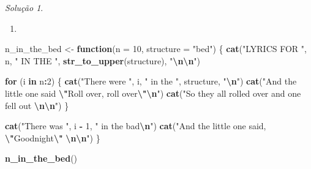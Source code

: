 \documentclass[
]{latex/krantz}
\newenvironment{Shaded}{\begin{snugshade}}{\end{snugshade}}
\newcommand{\AttributeTok}[1]{\textcolor[rgb]{0.13,0.29,0.53}{#1}}
\newcommand{\ControlFlowTok}[1]{\textcolor[rgb]{0.13,0.29,0.53}{\textbf{#1}}}
\newcommand{\DecValTok}[1]{\textcolor[rgb]{0.00,0.00,0.81}{#1}}
\newcommand{\FunctionTok}[1]{\textcolor[rgb]{0.13,0.29,0.53}{\textbf{#1}}}
\newcommand{\NormalTok}[1]{#1}
\newcommand{\OtherTok}[1]{\textcolor[rgb]{0.56,0.35,0.01}{#1}}
\newcommand{\SpecialCharTok}[1]{\textcolor[rgb]{0.81,0.36,0.00}{\textbf{#1}}}
\newcommand{\StringTok}[1]{\textcolor[rgb]{0.31,0.60,0.02}{#1}}
\providecommand{\tightlist}{%
  \setlength{\itemsep}{0pt}\setlength{\parskip}{0pt}}
\theoremstyle{definition}
\theoremstyle{definition}
\theoremstyle{definition}
\theoremstyle{definition}
\theoremstyle{remark}
\newtheorem*{solution}{Solução}
\begin{document}
\begin{solution}
\begin{enumerate}
\def\labelenumi{\alph{enumi}.}
\setcounter{enumi}{1}
\tightlist
\item
\end{enumerate}

\begin{Shaded}
\begin{Highlighting}[]
\NormalTok{n\_in\_the\_bed }\OtherTok{\textless{}{-}} \ControlFlowTok{function}\NormalTok{(}\AttributeTok{n =} \DecValTok{10}\NormalTok{, }\AttributeTok{structure =} \StringTok{"bed"}\NormalTok{) \{}
  \FunctionTok{cat}\NormalTok{(}\StringTok{"LYRICS FOR "}\NormalTok{, n, }\StringTok{" IN THE "}\NormalTok{, }\FunctionTok{str\_to\_upper}\NormalTok{(structure), }\StringTok{"}\SpecialCharTok{\textbackslash{}n\textbackslash{}n}\StringTok{"}\NormalTok{)}
  
  \ControlFlowTok{for}\NormalTok{ (i }\ControlFlowTok{in}\NormalTok{ n}\SpecialCharTok{:}\DecValTok{2}\NormalTok{) \{}
    \FunctionTok{cat}\NormalTok{(}\StringTok{"There were "}\NormalTok{, i, }\StringTok{" in the "}\NormalTok{, structure, }\StringTok{"}\SpecialCharTok{\textbackslash{}n}\StringTok{"}\NormalTok{)}
    \FunctionTok{cat}\NormalTok{(}\StringTok{"And the little one said }\SpecialCharTok{\textbackslash{}"}\StringTok{Roll over, roll over}\SpecialCharTok{\textbackslash{}"\textbackslash{}n}\StringTok{"}\NormalTok{)}
    \FunctionTok{cat}\NormalTok{(}\StringTok{"So they all rolled over and one fell out }\SpecialCharTok{\textbackslash{}n\textbackslash{}n}\StringTok{"}\NormalTok{)}
\NormalTok{  \}}

  \FunctionTok{cat}\NormalTok{(}\StringTok{"There was "}\NormalTok{, i }\SpecialCharTok{{-}} \DecValTok{1}\NormalTok{, }\StringTok{" in the bad}\SpecialCharTok{\textbackslash{}n}\StringTok{"}\NormalTok{)}
  \FunctionTok{cat}\NormalTok{(}\StringTok{"And the little one said, }\SpecialCharTok{\textbackslash{}"}\StringTok{Goodnight}\SpecialCharTok{\textbackslash{}"}\StringTok{ }\SpecialCharTok{\textbackslash{}n\textbackslash{}n}\StringTok{"}\NormalTok{)}
\NormalTok{\}}

\FunctionTok{n\_in\_the\_bed}\NormalTok{()}
\end{Highlighting}
\end{Shaded}


\end{solution}
\end{document}
